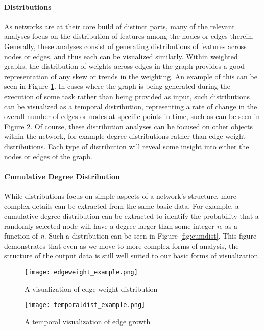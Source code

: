 \paragraph{Distributions}
As networks are at their core build of distinct parts, many of the relevant analyses focus on the distribution of features among the nodes or edges therein. Generally, these analyses consist of generating distributions of features across nodes or edges, and thus each can be visualized similarly. Within weighted graphs, the distribution of weights across edges in the graph provides a good representation of any skew or trends in the weighting. An example of this can be seen in Figure \ref{fig:edgeweight}. In cases where the graph is being generated during the execution of some task rather than being provided as input, such distributions can be visualized as a temporal distribution, representing a rate of change in the overall number of edges or nodes at specific points in time, such as can be seen in Figure \ref{fig:temporaldist}. Of course, these distribution analyses can be focused on other objects within the network, for example degree distributions rather than edge weight distributions. Each type of distribution will reveal some insight into either the nodes or edges of the graph. 

\paragraph{Cumulative Degree Distribution}
While distributions focus on simple aspects of a network's structure, more complex details can be extracted from the same basic data. For example, a cumulative degree distribution can be extracted to identify the probability that a randomly selected node will have a degree larger than some integer \emph{n}, as a function of \emph{n}. Such a distribution can be seen in Figure \ref{fig:cumdist}. This figure demonstrates that even as we move to more complex forms of analysis, the structure of the output data is still well suited to our basic forms of visualization. 

\begin{figure}
	\centering
	\texttt{[image: edgeweight\_example.png]}
	\caption{A visualization of edge weight distribution \citep{KONECT}}
	\label{fig:edgeweight}
\end{figure}

\begin{figure}
	\centering
	\texttt{[image: temporaldist\_example.png]}
	\caption{A temporal visualization of edge growth \citep{KONECT}}
	\label{fig:temporaldist}
\end{figure}

